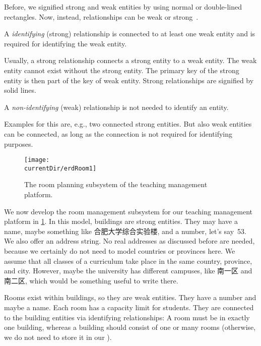 Before, we signified strong and weak entities by using normal or double-lined rectangles.
Now, instead, relationships can be weak or strong~\cite{P2024C6DS:EM}.%
%
\begin{definition}%
A \emph{identifying} (strong) relationship is connected to at least one weak entity and is required for identifying the weak entity. %
\end{definition}%
%
Usually, a strong relationship connects a strong entity to a weak entity.
The weak entity cannot exist without the strong entity.
The primary key of the strong entity is then part of the key of weak entity.
Strong relationships are signified by solid lines.%
%
\begin{definition}%
A \emph{non-identifying} (weak) relationship is not needed to identify an entity.%
\end{definition}%
Examples for this are, e.g., two connected strong entities.
But also weak entities can be connected, as long as the connection is not required for identifying purposes.

\begin{figure}%
\centering%
\texttt{[image: \\currentDir/erdRoom1]}%
\caption{The room planning subsystem of the teaching management platform.}%
\label{fig:erdRoom1}%
\end{figure}%
%
We now develop the room management subsystem for our teaching management platform in \cref{fig:erdRoom1}.
In this model, buildings are strong entities.
They may have a name, maybe something like 合肥大学综合实验楼, and a number, let's say~53.
We also offer an address string.
No real addresses as discussed before are needed, because we certainly do not need to model countries or provinces here.
We assume that all classes of a curriculum take place in the same country, province, and city.
However, maybe the university has different campuses, like 南一区 and 南二区, which would be something useful to write there.

Rooms exist within buildings, so they are weak entities.
They have a number and maybe a name.
Each room has a capacity limit for students.
They are connected to the building entities via identifying relationships:
A room must be in exactly one building, whereas a building should consist of one or many rooms (otherwise, we do not need to store it in our \db).


